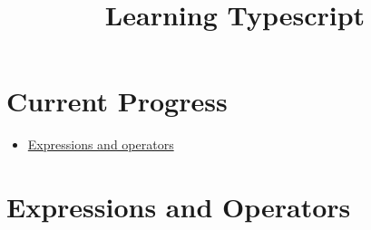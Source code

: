\documentclass{report}
\begin{document}
\title{Learning Typescript}

\chapter{Current Progress}%
\label{cha:Current_Progress}
\begin{itemize}
	\item \href{https://developer.mozilla.org/en-US/docs/Web/JavaScript/Guide/Expressions_and_operators}{Expressions and operators}
\end{itemize}

\chapter{Expressions and Operators}%
\label{cha:Expressions_and_Operators}

\end{document}
